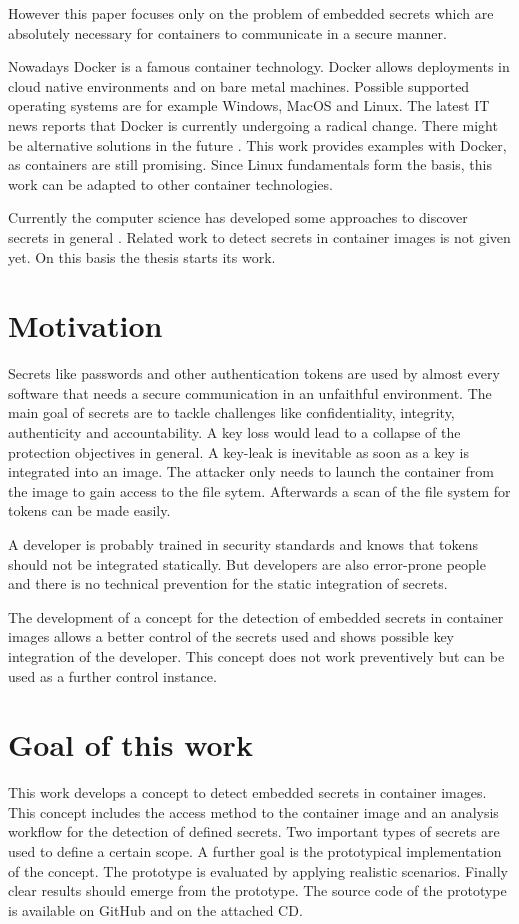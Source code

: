 However this paper focuses only on the problem of embedded secrets which are absolutely necessary for containers to communicate in a secure manner.

Nowadays Docker is a famous container technology. Docker allows deployments in cloud native environments and on bare metal machines. Possible supported operating systems are for example Windows, MacOS and Linux.
The latest IT news reports that Docker is currently undergoing a radical change. There might be alternative solutions in the future \cite{docker_heise}. This work provides examples with Docker, as containers are still promising. Since Linux fundamentals form the basis, this work can be adapted to other container technologies.

Currently the computer science has developed some approaches to discover secrets in general \cite{7180102}. Related work to detect secrets in container images is not given yet.
On this basis the thesis starts its work.

%
%
\section{Motivation}
\label{sec:intro:motivation}
Secrets like passwords and other authentication tokens are used by almost every software that needs a secure communication in an unfaithful environment. 
The main goal of secrets are to tackle challenges like confidentiality, integrity, authenticity and accountability. 
A key loss would lead to a collapse of the  protection objectives in general. A key-leak is inevitable as soon as a key is integrated into an image.
The attacker only needs to launch the container from the image to gain access to the file sytem. Afterwards a scan of the file system for tokens can be made easily. 

A developer is probably trained in security standards and knows that tokens should not be integrated statically. 
But developers are also error-prone people and there is no technical prevention for the static integration of secrets. 

The development of a concept for the detection of embedded secrets in container images allows a better control of the secrets used and shows possible key integration of the developer. 
This concept does not work preventively but can be used as a further control instance.%
%
\section{Goal of this work}
\label{sec:intro:goal}
This work develops a concept to detect embedded secrets in container images. 
This concept includes the access method to the container image and an analysis workflow for the detection of defined secrets. 
Two important types of secrets are used to define a certain scope. A further goal is the prototypical implementation of the concept. 
The prototype is evaluated by applying realistic scenarios.
Finally clear results should emerge from the prototype. 
The source code of the prototype is available on GitHub \cite{githublinse} and on the attached CD.

